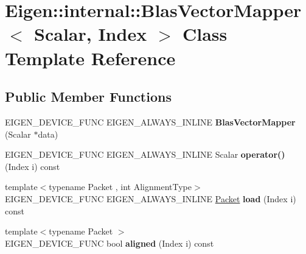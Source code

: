 \hypertarget{class_eigen_1_1internal_1_1_blas_vector_mapper}{}\section{Eigen\+::internal\+::Blas\+Vector\+Mapper$<$ Scalar, Index $>$ Class Template Reference}
\label{class_eigen_1_1internal_1_1_blas_vector_mapper}
\subsection*{Public Member Functions}
\begin{DoxyCompactItemize}
\item 
\mbox{\label{class_eigen_1_1internal_1_1_blas_vector_mapper_af960b8e257c177df77229dfdb693ce11}} 
E\+I\+G\+E\+N\+\_\+\+D\+E\+V\+I\+C\+E\+\_\+\+F\+U\+NC E\+I\+G\+E\+N\+\_\+\+A\+L\+W\+A\+Y\+S\+\_\+\+I\+N\+L\+I\+NE {\bfseries Blas\+Vector\+Mapper} (Scalar $\ast$data)
\item 
\mbox{\label{class_eigen_1_1internal_1_1_blas_vector_mapper_aad255f311f5104bb1ab25555b5064053}} 
E\+I\+G\+E\+N\+\_\+\+D\+E\+V\+I\+C\+E\+\_\+\+F\+U\+NC E\+I\+G\+E\+N\+\_\+\+A\+L\+W\+A\+Y\+S\+\_\+\+I\+N\+L\+I\+NE Scalar {\bfseries operator()} (Index i) const
\item 
\mbox{\label{class_eigen_1_1internal_1_1_blas_vector_mapper_a2a6098ea0c20a5f32b672b713819175c}} 
{\footnotesize template$<$typename Packet , int Alignment\+Type$>$ }\\E\+I\+G\+E\+N\+\_\+\+D\+E\+V\+I\+C\+E\+\_\+\+F\+U\+NC E\+I\+G\+E\+N\+\_\+\+A\+L\+W\+A\+Y\+S\+\_\+\+I\+N\+L\+I\+NE \mbox{\hyperlink{union_eigen_1_1internal_1_1_packet}{Packet}} {\bfseries load} (Index i) const
\item 
\mbox{\label{class_eigen_1_1internal_1_1_blas_vector_mapper_ab5c476e3545d42b5be634611a2a7523a}} 
{\footnotesize template$<$typename Packet $>$ }\\E\+I\+G\+E\+N\+\_\+\+D\+E\+V\+I\+C\+E\+\_\+\+F\+U\+NC bool {\bfseries aligned} (Index i) const
\end{DoxyCompactItemize}
